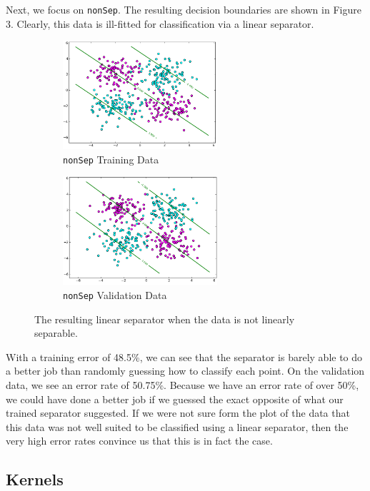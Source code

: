 \documentclass{sigchi}
\begin{document}
Next, we focus on \texttt{nonSep}. The resulting decision boundaries are shown in Figure 3. Clearly, this data is ill-fitted for classification via a linear separator.

\begin{figure}
\centering

\begin{subfigure}[b]{2.25in}
	\includegraphics[width = 2.25in]{plots/1-2/nonSep2train.png}
	\caption{\texttt{nonSep} Training Data}
\end{subfigure}

\begin{subfigure}[b]{2.25in}
	\includegraphics[width = 2.25in]{plots/1-2/nonSep2valid.png}
	\caption{\texttt{nonSep} Validation Data}
\end{subfigure}
\caption{The resulting linear separator when the data is not linearly separable.}
\end{figure}

With a training error of 48.5\%, we can see that the separator is barely able to do a better job than randomly guessing how to classify each point. On the validation data, we see an error rate of 50.75\%. Because we have an error rate of over 50\%, we could have done a better job if we guessed the exact opposite of what our trained separator suggested. If we were not sure form the plot of the data that this data was not well suited to be classified using a linear separator, then the very high error rates convince us that this is in fact the case.

\subsection{Kernels}
\end{document}
